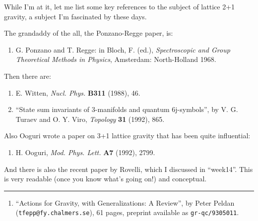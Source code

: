 \documentclass{article}
\def\tightlist{}
\begin{document}
While I'm at it, let me list some key references to the subject of
lattice 2+1 gravity, a subject I'm fascinated by these days.

The grandaddy of the all, the Ponzano-Regge paper, is:

\begin{enumerate}
\def\labelenumi{\arabic{enumi})}
\setcounter{enumi}{5}
\tightlist
\item
  G. Ponzano and T. Regge: in Bloch, F. (ed.), \emph{Spectroscopic and
  Group Theoretical Methods in Physics}, Amsterdam: North-Holland 1968.
\end{enumerate}

Then there are:

\begin{enumerate}
\def\labelenumi{\arabic{enumi})}
\setcounter{enumi}{6}
\item
  E. Witten, \emph{Nucl. Phys.} \textbf{B311} (1988), 46.
\item
  ``State sum invariants of 3-manifolds and quantum 6j-symbols'', by V.
  G. Turaev and O. Y. Viro, \emph{Topology} \textbf{31} (1992), 865.
\end{enumerate}

Also Ooguri wrote a paper on 3+1 lattice gravity that has been quite
influential:

\begin{enumerate}
\def\labelenumi{\arabic{enumi})}
\setcounter{enumi}{8}
\tightlist
\item
  H. Ooguri, \emph{Mod. Phys. Lett.} \textbf{A7} (1992), 2799.
\end{enumerate}

And there is also the recent paper by Rovelli, which I discussed in
``week14''. This is very readable (once you know what's going on!) and
conceptual.

\begin{center}\rule{0.5\linewidth}{0.5pt}\end{center}

\begin{enumerate}
\def\labelenumi{\arabic{enumi})}
\setcounter{enumi}{9}
\tightlist
\item
  ``Actions for Gravity, with Generalizations: A Review'', by Peter
  Peldan (\texttt{tfepp@fy.chalmers.se}), 61 pages, preprint available
  as \texttt{gr-qc/9305011}.
\end{enumerate}
\end{document}
